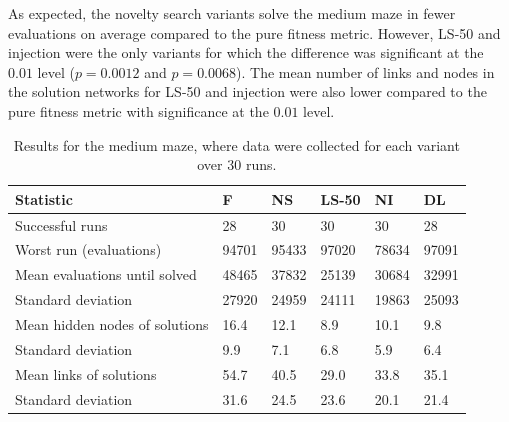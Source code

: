 As expected, the novelty search variants solve the medium maze in fewer evaluations on average
compared to the pure fitness metric. However, LS-50 and injection were the only variants for which
the difference was significant at the $0.01$ level ($p=0.0012$ and $p=0.0068$). The mean number of
links and nodes in the solution networks for LS-50 and injection were also lower
compared to the pure fitness metric with significance at the $0.01$ level.

\begin{table}[H]
    \centering
    \begin{tabular}{llllll}
    \toprule
    Statistic & \multicolumn{1}{l}{F} & \multicolumn{1}{l}{NS} & \multicolumn{1}{l}{LS-50} & \multicolumn{1}{l}{NI} & \multicolumn{1}{l}{DL} \\
    \midrule
    Successful runs & 28 & 30 & 30 & 30 & 28 \\
    Worst run (evaluations) & 94701 & 95433 & 97020 & 78634 & 97091 \\
    \rowcolor[gray]{.9} Mean evaluations until solved & 48465 & 37832 & 25139 & 30684 & 32991 \\
    Standard deviation & 27920  & 24959 & 24111 & 19863 & 25093 \\
    \rowcolor[gray]{.9} Mean hidden nodes of solutions & 16.4 & 12.1  & 8.9  & 10.1 & 9.8 \\
    Standard deviation & 9.9 & 7.1 & 6.8 & 5.9 & 6.4 \\
    \rowcolor[gray]{.9} Mean links of solutions & 54.7  & 40.5 & 29.0 & 33.8 & 35.1 \\
    Standard deviation & 31.6  & 24.5 & 23.6 & 20.1 & 21.4\\
    \bottomrule
    \end{tabular}
    \caption{Results for the medium maze, where data were collected for each variant over 30 runs.}
    \label{medium}
\end{table}

